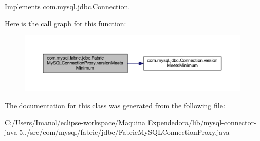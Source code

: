 Implements \mbox{\hyperlink{interfacecom_1_1mysql_1_1jdbc_1_1_connection_af05f0b2545de1a6a1ca7d41f467516d3}{com.\+mysql.\+jdbc.\+Connection}}.

Here is the call graph for this function\+:\nopagebreak
\begin{figure}[H]
\begin{center}
\leavevmode
\includegraphics[width=350pt]{classcom_1_1mysql_1_1fabric_1_1jdbc_1_1_fabric_my_s_q_l_connection_proxy_ab2140e74f8ea7de645f157f8416a8d37_cgraph}
\end{center}
\end{figure}


The documentation for this class was generated from the following file\+:\begin{DoxyCompactItemize}
\item 
C\+:/\+Users/\+Imanol/eclipse-\/workspace/\+Maquina Expendedora/lib/mysql-\/connector-\/java-\/5../src/com/mysql/fabric/jdbc/Fabric\+My\+S\+Q\+L\+Connection\+Proxy.\+java\end{DoxyCompactItemize}
